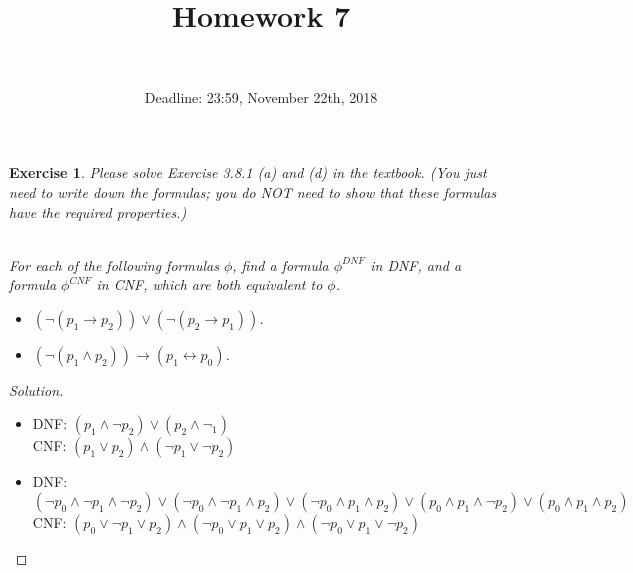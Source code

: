 \documentclass[12pt,a4paper]{article}
\title{Homework 7}
\author{\\
}
\date{Deadline: 23:59, November 22th, 2018}
\theoremstyle{plain}
\newtheorem{exercise}{Exercise}
\begin{document}
\maketitle



\begin{exercise}
Please solve Exercise 3.8.1 (a) and (d) in the textbook. 
(You just need to write down the formulas; you do NOT need to show that these formulas have the required properties.)

\ \\
For each of the following formulas $\phi$, find a formula $\phi^{DNF}$ in DNF, and a formula $\phi^{CNF}$ in CNF, which are both equivalent to $\phi$.
%
\begin{itemize}

\item[(a)] $( \neg ( p_1 \rightarrow p_2 ) ) \vee ( \neg ( p_2 \rightarrow p_1 ) )$.

\item[(d)] $( \neg ( p_1 \wedge p_2 ) ) \rightarrow ( p_1 \leftrightarrow p_0 )$.

\end{itemize}
\end{exercise}

\begin{proof}[Solution]\
    \begin{itemize}
        \item[(a)]
            DNF: $(p_1 \wedge \neg p_2)\vee(p_2 \wedge \neg_1)$\\
            CNF: $(p_1 \vee p_2)\wedge (\neg p_1 \vee \neg p_2)$
        \item[(d)]
            DNF: $(\neg p_0 \wedge \neg p_1 \wedge \neg p_2) \vee (\neg p_0 \wedge \neg p_1 \wedge p_2) \vee (\neg p_0 \wedge p_1 \wedge p_2) \vee (p_0 \wedge p_1 \wedge \neg p_2) \vee (p_0 \wedge p_1 \wedge p_2)$\\
            CNF: $(p_0 \vee \neg p_1 \vee p_2) \wedge (\neg p_0 \vee p_1 \vee p_2) \wedge (\neg p_0 \vee p_1 \vee \neg p_2) $
           
    \end{itemize}
\end{proof}
\end{document}
